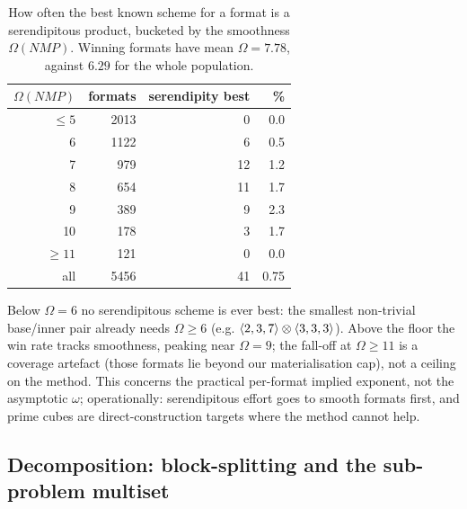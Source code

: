 \begin{table}[t]
\centering\small
\begin{tabular}{rrrr}
\toprule
\(\Omega(NMP)\) & formats & serendipity best & \% \\
\midrule
\(\le 5\) & 2013 & 0 & 0.0 \\
6 & 1122 & 6 & 0.5 \\
7 & 979 & 12 & 1.2 \\
8 & 654 & 11 & 1.7 \\
9 & 389 & 9 & 2.3 \\
10 & 178 & 3 & 1.7 \\
\(\ge 11\) & 121 & 0 & 0.0 \\
\midrule
all & 5456 & 41 & 0.75 \\
\bottomrule
\end{tabular}
\caption{How often the best known scheme for a format is a serendipitous product, bucketed
by the smoothness \(\Omega(NMP)\). Winning formats have mean \(\Omega = 7.78\), against
\(6.29\) for the whole population.}
\label{tab:serendip-smooth}
\end{table}

Below \(\Omega=6\) no serendipitous scheme is ever best: the smallest non-trivial
base/inner pair already needs \(\Omega\ge6\) (e.g.
\(\langle 2, 3, 7 \rangle\otimes\langle 3, 3, 3 \rangle\)). Above the floor the win rate tracks
smoothness, peaking near \(\Omega=9\); the fall-off at \(\Omega\ge11\) is a coverage
artefact (those formats lie beyond our materialisation cap), not a ceiling on the method.
This concerns the practical per-format implied exponent, not the asymptotic \(\omega\);
operationally: serendipitous effort goes to smooth formats first, and prime cubes are
direct-construction targets where the method cannot help.

\subsection{Decomposition: block-splitting and the sub-problem multiset}
\label{ssec:decomposition}

